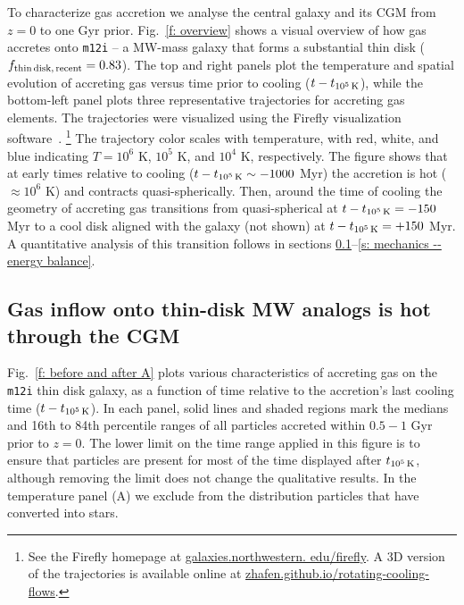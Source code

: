 \documentclass[fleqn,usenatbib]{mnras}
\newcommand{\fthin}{f_{\rm thin\,disk,\,recent}}
\newcommand{\tcools}{t_{10^5\,{\rm K}}}
\begin{document}
To characterize gas accretion we analyse the central galaxy and its CGM from $z=0$ to one Gyr prior.
Fig.~\ref{f: overview} shows a visual overview of how gas accretes onto \texttt{m12i} -- a MW-mass galaxy that forms a substantial thin disk ($\fthin = 0.83$). 
The top and right panels plot the temperature and spatial evolution of accreting gas versus time prior to cooling ($t-\tcools$), while the bottom-left panel plots three representative trajectories for accreting gas elements.
The trajectories were visualized using the Firefly visualization software~\citep{Geller2018}.
\footnote{See the Firefly homepage at \url{galaxies.northwestern. edu/firefly}.
A 3D version of the trajectories is available online at \url{zhafen.github.io/rotating-cooling-flows}.}
The trajectory color scales with temperature, with red, white, and blue indicating $T=10^6$ K, $10^5$ K, and $10^4$ K, respectively.
The figure shows that at early times relative to cooling ($t-\tcools \sim -1000$ Myr) the accretion is hot ($\approx10^6$ K) and contracts quasi-spherically.
Then, around the time of cooling the geometry of accreting gas transitions from quasi-spherical at $t - \tcools=-150$ Myr to a cool disk aligned with the galaxy (not shown) at $t - \tcools=+ 150$ Myr.
A quantitative analysis of this transition follows in sections \ref{s: characteristics -- inflowing gas phase}--\ref{s: mechanics -- energy balance}.

\subsection{Gas inflow onto thin-disk MW analogs is hot through the CGM}
\label{s: characteristics -- inflowing gas phase}

Fig.~\ref{f: before and after A} plots various characteristics of accreting gas on the \texttt{m12i} thin disk galaxy, as a function of time relative to the accretion's last cooling time ($t - \tcools$).
In each panel, solid lines and shaded regions mark the medians and 16th to 84th percentile ranges of all particles accreted within $0.5-1$ Gyr prior to $z=0$.
The lower limit on the time range applied in this figure is to ensure that particles are present for most of the time displayed after $\tcools$, although removing the limit does not change the qualitative results.
In the temperature panel (A) we exclude from the distribution particles that have converted into stars. 
\end{document}
